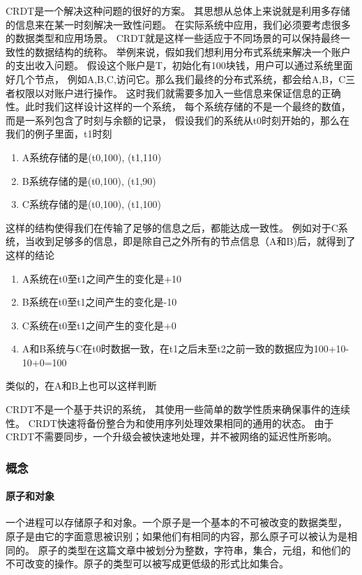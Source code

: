 \documentclass[11pt]{article}
\begin{document}
CRDT是一个解决这种问题的很好的方案。
其思想从总体上来说就是利用多存储的信息来在某一时刻解决一致性问题。
在实际系统中应用，我们必须要考虑很多的数据类型和应用场景。
CRDT就是这样一些适应于不同场景的可以保持最终一致性的数据结构的统称。
举例来说，假如我们想利用分布式系统来解决一个账户的支出收入问题。
假设这个账户是T，初始化有100块钱，用户可以通过系统里面好几个节点，
例如A,B,C,访问它。那么我们最终的分布式系统，都会给A,B，C三者权限以对账户进行操作。
这时我们就需要多加入一些信息来保证信息的正确性。此时我们这样设计这样的一个系统，
每个系统存储的不是一个最终的数值，而是一系列包含了时刻与余额的记录，
假设我们的系统从t0时刻开始的，那么在我们的例子里面，t1时刻
\begin{enumerate}
    \item A系统存储的是(t0,100), (t1,110)
    \item B系统存储的是(t0,100), (t1,90)
    \item C系统存储的是(t0,100), (t1,100)
\end{enumerate}
这样的结构使得我们在传输了足够的信息之后，都能达成一致性。
例如对于C系统，当收到足够多的信息，即是除自己之外所有的节点信息（A和B)后，就得到了这样的结论
\begin{enumerate}
    \item A系统在t0至t1之间产生的变化是+10
    \item B系统在t0至t1之间产生的变化是-10
    \item C系统在t0至t1之间产生的变化是+0
    \item A和B系统与C在t0时数据一致，在t1之后未至t2之前一致的数据应为100+10-10+0=100
\end{enumerate}
类似的，在A和B上也可以这样判断

CRDT不是一个基于共识的系统，
其使用一些简单的数学性质来确保事件的连续性。
CRDT快速将备份整合为和使用序列处理效果相同的通用的状态。
由于CRDT不需要同步，一个升级会被快速地处理，并不被网络的延迟性所影响。

\subsubsection{概念}
\paragraph{原子和对象}
一个进程可以存储原子和对象。一个原子是一个基本的不可被改变的数据类型，
原子是由它的字面意思被识别；如果他们有相同的内容，那么原子可以被认为是相同的。
原子的类型在这篇文章中被划分为整数，字符串，集合，元组，和他们的不可改变的操作。原子的类型可以被写成更低级的形式比如集合。
\end{document}
